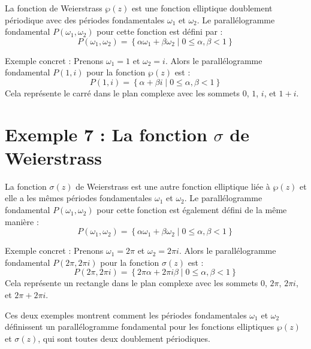 \documentclass[12pt]{article}
\begin{document}
 La fonction de Weierstrass \(\wp(z)\) est une fonction elliptique doublement périodique avec des périodes fondamentales \(\omega_1\) et \(\omega_2\). Le parallélogramme fondamental \(P(\omega_1, \omega_2)\) pour cette fonction est défini par :
 \[ P(\omega_1, \omega_2) = \left\{ \alpha \omega_1 + \beta \omega_2 \mid 0 \leq \alpha, \beta < 1 \right\} \]

 Exemple concret : Prenons \(\omega_1 = 1\) et \(\omega_2 = i\). Alors le parallélogramme fondamental \(P(1, i)\) pour la fonction \(\wp(z)\) est :
 \[ P(1, i) = \left\{ \alpha + \beta i \mid 0 \leq \alpha, \beta < 1 \right\} \]
 Cela représente le carré dans le plan complexe avec les sommets \(0\), \(1\), \(i\), et \(1 + i\).

 \section*{\textbf{Exemple 7 :} La fonction \(\sigma\) de Weierstrass}

 La fonction \(\sigma(z)\) de Weierstrass est une autre fonction elliptique liée à \(\wp(z)\) et elle a les mêmes périodes fondamentales \(\omega_1\) et \(\omega_2\). Le parallélogramme fondamental \(P(\omega_1, \omega_2)\) pour cette fonction est également défini de la même manière :
 \[ P(\omega_1, \omega_2) = \left\{ \alpha \omega_1 + \beta \omega_2 \mid 0 \leq \alpha, \beta < 1 \right\} \]

 Exemple concret : Prenons \(\omega_1 = 2\pi\) et \(\omega_2 = 2\pi i\). Alors le parallélogramme fondamental \(P(2\pi, 2\pi i)\) pour la fonction \(\sigma(z)\) est :
 \[ P(2\pi, 2\pi i) = \left\{ 2\pi \alpha + 2\pi i \beta \mid 0 \leq \alpha, \beta < 1 \right\} \]
 Cela représente un rectangle dans le plan complexe avec les sommets \(0\), \(2\pi\), \(2\pi i\), et \(2\pi + 2\pi i\).

 Ces deux exemples montrent comment les périodes fondamentales \(\omega_1\) et \(\omega_2\) définissent un parallélogramme fondamental pour les fonctions elliptiques \(\wp(z)\) et \(\sigma(z)\), qui sont toutes deux doublement périodiques.
\end{document}
